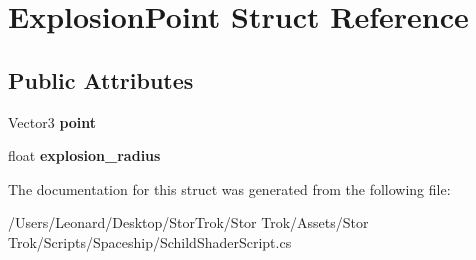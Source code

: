 \hypertarget{struct_explosion_point}{}\section{Explosion\+Point Struct Reference}
\label{struct_explosion_point}
\subsection*{Public Attributes}
\begin{DoxyCompactItemize}
\item 
\mbox{\label{struct_explosion_point_a5ea10ad427c367b0d78e8d00d9ae06e9}} 
Vector3 {\bfseries point}
\item 
\mbox{\label{struct_explosion_point_ac1f32dc2bbf319d64dc1cd31fcc2f5e4}} 
float {\bfseries explosion\+\_\+radius}
\end{DoxyCompactItemize}


The documentation for this struct was generated from the following file\+:\begin{DoxyCompactItemize}
\item 
/\+Users/\+Leonard/\+Desktop/\+Stor\+Trok/\+Stor Trok/\+Assets/\+Stor Trok/\+Scripts/\+Spaceship/Schild\+Shader\+Script.\+cs\end{DoxyCompactItemize}
